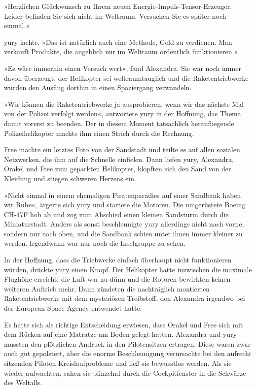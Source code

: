 »Herzlichen Glückwunsch zu Ihrem neuen Energie-Impuls-Tensor-Erzeuger. Leider befinden Sie sich nicht im Weltraum. Versuchen Sie es später noch einmal.«

yury lachte. »Das ist natürlich auch eine Methode, Geld zu verdienen. Man verkauft Produkte, die angeblich nur im Weltraum ordentlich funktionieren.«

»Es wäre immerhin einen Versuch wert«, fand Alexandra. Sie war noch immer davon überzeugt, der Helikopter sei weltraumtauglich und die Raketentriebwerke würden den Ausflug dorthin in einen Spaziergang verwandeln.

»Wir können die Raketentriebwerke ja ausprobieren, wenn wir das nächste Mal von der Polizei verfolgt werden«, antwortete yury in der Hoffnung, das Thema damit vorerst zu beenden. Der in diesem Moment tatsächlich heranfliegende Polizeihelikopter machte ihm einen Strich durch die Rechnung.

Free machte ein letztes Foto von der Sandstadt und teilte es auf allen sozialen Netzwerken, die ihm auf die Schnelle einfielen. Dann liefen yury, Alexandra, Orakel und Free zum geparkten Helikopter, klopften sich den Sand von der Kleidung und stiegen schweren Herzens ein.

»Nicht einmal in einem ehemaligen Piratenparadies auf einer Sandbank haben wir Ruhe«, ärgerte sich yury und startete die Motoren. Die umgerüstete Boeing CH-47F hob ab und zog zum Abschied einen kleinen Sandsturm durch die Miniaturstadt. Anders als sonst beschleunigte yury allerdings nicht nach vorne, sondern nur nach oben, und die Sandbank schien unter ihnen immer kleiner zu werden. Irgendwann war nur noch die Inselgruppe zu sehen.

In der Hoffnung, dass die Triebwerke einfach überhaupt nicht funktionieren würden, drückte yury einen Knopf. Der Helikopter hatte inzwischen die maximale Flughöhe erreicht; die Luft war zu dünn und die Rotoren bewirkten keinen weiteren Auftrieb mehr. Dann zündeten die nachträglich montierten Raketentriebwerke mit dem mysteriösen Treibstoff, den Alexandra irgendwo bei der European Space Agency entwendet hatte.

Es hatte sich als richtige Entscheidung erwiesen, dass Orakel und Free sich mit dem Rücken auf eine Matratze am Boden gelegt hatten. Alexandra und yury mussten den plötzlichen Andruck in den Pilotensitzen ertragen. Diese waren zwar auch gut gepolstert, aber die enorme Beschleunigung verursachte bei den aufrecht sitzenden Piloten Kreislaufprobleme und ließ sie bewusstlos werden. Als sie wieder aufwachten, sahen sie blinzelnd durch die Cockpitfenster in die Schwärze des Weltalls.

